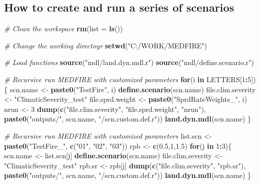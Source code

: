 \documentclass[
]{article}
\newenvironment{Shaded}{\begin{snugshade}}{\end{snugshade}}
\newcommand{\CommentTok}[1]{\textcolor[rgb]{0.56,0.35,0.01}{\textit{#1}}}
\newcommand{\ControlFlowTok}[1]{\textcolor[rgb]{0.13,0.29,0.53}{\textbf{#1}}}
\newcommand{\DataTypeTok}[1]{\textcolor[rgb]{0.13,0.29,0.53}{#1}}
\newcommand{\DecValTok}[1]{\textcolor[rgb]{0.00,0.00,0.81}{#1}}
\newcommand{\FloatTok}[1]{\textcolor[rgb]{0.00,0.00,0.81}{#1}}
\newcommand{\KeywordTok}[1]{\textcolor[rgb]{0.13,0.29,0.53}{\textbf{#1}}}
\newcommand{\NormalTok}[1]{#1}
\newcommand{\OperatorTok}[1]{\textcolor[rgb]{0.81,0.36,0.00}{\textbf{#1}}}
\newcommand{\StringTok}[1]{\textcolor[rgb]{0.31,0.60,0.02}{#1}}
\begin{document}
\hypertarget{how-to-create-and-run-a-series-of-scenarios}{%
\subsection{How to create and run a series of
scenarios}\label{how-to-create-and-run-a-series-of-scenarios}}

\begin{Shaded}
\begin{Highlighting}[]
\CommentTok{# Clean the workspace}
\KeywordTok{rm}\NormalTok{(}\DataTypeTok{list =} \KeywordTok{ls}\NormalTok{())}

\CommentTok{# Change the working directoyr}
\KeywordTok{setwd}\NormalTok{(}\StringTok{"C:/WORK/MEDFIRE"}\NormalTok{)}

\CommentTok{# Load functions}
\KeywordTok{source}\NormalTok{(}\StringTok{"mdl/land.dyn.mdl.r"}\NormalTok{)}
\KeywordTok{source}\NormalTok{(}\StringTok{"mdl/define.scenario.r"}\NormalTok{) }

\CommentTok{# Recursive run MEDFIRE with customized parameters}
\ControlFlowTok{for}\NormalTok{(i }\ControlFlowTok{in}\NormalTok{ LETTERS[}\DecValTok{1}\OperatorTok{:}\DecValTok{5}\NormalTok{])\{}
\NormalTok{  scn.name <-}\StringTok{ }\KeywordTok{paste0}\NormalTok{(}\StringTok{"TestFire"}\NormalTok{, i)}
  \KeywordTok{define.scenario}\NormalTok{(scn.name)}
\NormalTok{  file.clim.severity <-}\StringTok{ "ClimaticSeverity_test"}
\NormalTok{  file.sprd.weight <-}\StringTok{ }\KeywordTok{paste0}\NormalTok{(}\StringTok{"SprdRateWeights_"}\NormalTok{, i)}
\NormalTok{  nrun <-}\StringTok{ }\DecValTok{3}
  \KeywordTok{dump}\NormalTok{(}\KeywordTok{c}\NormalTok{(}\StringTok{"file.clim.severity"}\NormalTok{, }\StringTok{"file.sprd.weight"}\NormalTok{, }\StringTok{"nrun"}\NormalTok{), }
       \KeywordTok{paste0}\NormalTok{(}\StringTok{"outputs/"}\NormalTok{, scn.name, }\StringTok{"/scn.custom.def.r"}\NormalTok{))}
  \KeywordTok{land.dyn.mdl}\NormalTok{(scn.name)}
\NormalTok{\}}

\CommentTok{# Recursive run MEDFIRE with customized parameters}
\NormalTok{list.scn <-}\StringTok{ }\KeywordTok{paste0}\NormalTok{(}\StringTok{"TestFire_"}\NormalTok{, }\KeywordTok{c}\NormalTok{(}\StringTok{"01"}\NormalTok{, }\StringTok{"02"}\NormalTok{, }\StringTok{"03"}\NormalTok{))}
\NormalTok{rpb <-}\StringTok{ }\KeywordTok{c}\NormalTok{(}\FloatTok{0.5}\NormalTok{,}\DecValTok{1}\NormalTok{,}\FloatTok{1.5}\NormalTok{)}
\ControlFlowTok{for}\NormalTok{(j }\ControlFlowTok{in} \DecValTok{1}\OperatorTok{:}\DecValTok{3}\NormalTok{)\{}
\NormalTok{  scn.name <-}\StringTok{ }\NormalTok{list.scn[j]}
  \KeywordTok{define.scenario}\NormalTok{(scn.name)}
\NormalTok{  file.clim.severity <-}\StringTok{ "ClimaticSeverity_test"}
\NormalTok{  rpb.sr <-}\StringTok{ }\NormalTok{rpb[j]}
  \KeywordTok{dump}\NormalTok{(}\KeywordTok{c}\NormalTok{(}\StringTok{"file.clim.severity"}\NormalTok{, }\StringTok{"rpb.sr"}\NormalTok{), }
       \KeywordTok{paste0}\NormalTok{(}\StringTok{"outputs/"}\NormalTok{, scn.name, }\StringTok{"/scn.custom.def.r"}\NormalTok{))}
  \KeywordTok{land.dyn.mdl}\NormalTok{(scn.name)}
\NormalTok{\}}
\end{Highlighting}
\end{Shaded}
\end{document}
